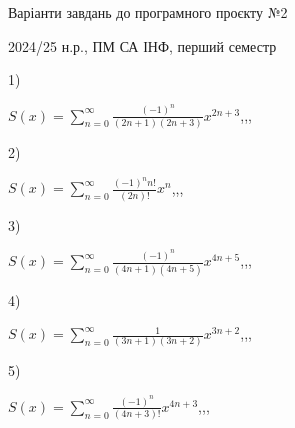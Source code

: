 \documentclass[11pt, ukrainian]{article}
\begin{document}
{\Large \center  Варіанти завдань до програмного проєкту №2\par 2024/25 н.р., ПМ СА ІНФ, перший семестр\par \bigskip}
1) \space 
{%
{$S(x)=\sum\limits_{n=0}^{\infty}{\frac{(-1)^n}{(2n+1)(2n+3)}}{x^{{2n+3}}}$},,, \par \smallskip  
}
\par
\vspace{0.9cm}
2) \space 
{%
{$S(x)=\sum\limits_{n=0}^{\infty}{\frac{{(-1)^n}{n!}}{(2n)!}}{x^{{n}}}$},,, \par \smallskip  
}
\par
\vspace{0.9cm}
3) \space 
{%
{$S(x)=\sum\limits_{n=0}^{\infty}{\frac{(-1)^n}{(4n+1)(4n+5)}}{x^{{4n+5}}}$},,, \par \smallskip  
}
\par
\vspace{0.9cm}
4) \space 
{%
{$S(x)=\sum\limits_{n=0}^{\infty}{\frac{1}{(3n+1)(3n+2)}}{x^{{3n+2}}}$},,, \par \smallskip  
}
\par
\vspace{0.9cm}
5) \space 
{%
{$S(x)=\sum\limits_{n=0}^{\infty}{\frac{(-1)^n}{(4n+3)!}}{x^{{4n+3}}}$},,, \par \smallskip  
}
\end{document}
